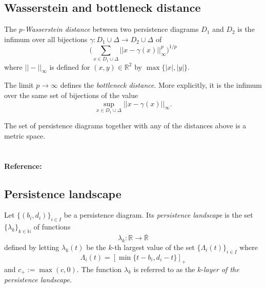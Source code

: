 \documentclass{amsart}
\begin{document}
	\subsection*{Wasserstein and bottleneck distance}	\label{wasserstein_and_bottleneck_distance}
	
	The $p$\textit{-Wasserstein distance} between two persistence diagrams $D_1$ and $D_2$ is the infimum over all bijections $\gamma: D_1 \cup \Delta \to D_2 \cup \Delta$ of
	\begin{equation*}
	\Big(\sum_{x \in D_1 \cup \Delta} ||x - \gamma(x)||_\infty^p \Big)^{1/p}
	\end{equation*}
	where $||-||_\infty$ is defined for $(x,y) \in \mathbb R^2$ by $\max\{|x|, |y|\}$. 
	
	The limit $p \to \infty$ defines the \textit{bottleneck distance}. More explicitly, it is the infimum over the same set of bijections of the value
	\begin{equation*}
	\sup_{x \in D_1 \cup \Delta} ||x - \gamma(x)||_{\infty}.
	\end{equation*}

	The set of persistence diagrams together with any of the distances above is a
	metric space.
	
	\paragraph{\\ Reference:} \cite{kerber2017geometry}
	
	\subsection*{Persistence landscape} \label{persistence_landscape}	
	
	Let $\{(b_i, d_i)\}_{i \in I}$ be a 
	persistence diagram. Its \textit{persistence landscape} is the set $\{\lambda_k\}_{k \in \mathbb N}$ of functions	
	\begin{equation*}	
	\lambda_k : \mathbb R \to \overline{\mathbb R}	
	\end{equation*}	
	defined by letting $\lambda_k(t)$ be the $k$-th largest value of the set $\{\Lambda_i(t)\}_ {i \in I}$ where	
	\begin{equation*}	
	\Lambda_i(t) = \left[ \min \{t-b_i, d_i-t\}\right]_+	
	\end{equation*}	
	and $c_+ := \max(c,0)$. The function $\lambda_k$ is referred to as the $k$-\textit{layer of the persistence landscape}.
	
\end{document}
